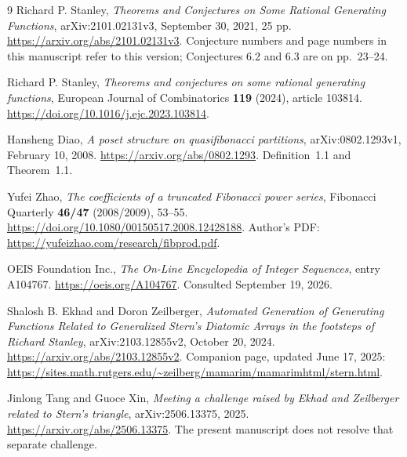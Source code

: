 \documentclass[11pt,letterpaper]{article}
\numberwithin{equation}{section}
\theoremstyle{definition}
\theoremstyle{remark}
\begin{document}
\begin{thebibliography}{9}
Richard P. Stanley,
\emph{Theorems and Conjectures on Some Rational Generating Functions},
arXiv:2101.02131v3, September 30, 2021, 25 pp.
\url{https://arxiv.org/abs/2101.02131v3}.
Conjecture numbers and page numbers in this manuscript refer to this
version; Conjectures 6.2 and 6.3 are on pp.~23--24.

Richard P. Stanley,
\emph{Theorems and conjectures on some rational generating functions},
European Journal of Combinatorics \textbf{119} (2024), article 103814.
\url{https://doi.org/10.1016/j.ejc.2023.103814}.

Hansheng Diao,
\emph{A poset structure on quasifibonacci partitions},
arXiv:0802.1293v1, February 10, 2008.
\url{https://arxiv.org/abs/0802.1293}.
Definition~1.1 and Theorem~1.1.

Yufei Zhao,
\emph{The coefficients of a truncated Fibonacci power series},
Fibonacci Quarterly \textbf{46/47} (2008/2009), 53--55.
\url{https://doi.org/10.1080/00150517.2008.12428188}.
Author's PDF: \url{https://yufeizhao.com/research/fibprod.pdf}.

OEIS Foundation Inc.,
\emph{The On-Line Encyclopedia of Integer Sequences}, entry A104767.
\url{https://oeis.org/A104767}. Consulted September 19, 2026.

Shalosh B. Ekhad and Doron Zeilberger,
\emph{Automated Generation of Generating Functions Related to Generalized
Stern's Diatomic Arrays in the footsteps of Richard Stanley},
arXiv:2103.12855v2, October 20, 2024.
\url{https://arxiv.org/abs/2103.12855v2}.
Companion page, updated June 17, 2025:
\url{https://sites.math.rutgers.edu/~zeilberg/mamarim/mamarimhtml/stern.html}.

Jinlong Tang and Guoce Xin,
\emph{Meeting a challenge raised by Ekhad and Zeilberger related to Stern's
triangle}, arXiv:2506.13375, 2025.
\url{https://arxiv.org/abs/2506.13375}.
The present manuscript does not resolve that separate challenge.
\end{thebibliography}
\end{document}
